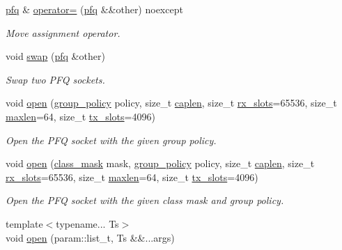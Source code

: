 \begin{DoxyCompactItemize}
\hyperlink{classnet_1_1pfq}{pfq} \& \hyperlink{classnet_1_1pfq_aeacd42c1616840fa20e67bbf47c71e70}{operator=} (\hyperlink{classnet_1_1pfq}{pfq} \&\&other) noexcept
\begin{DoxyCompactList}\small\item\em Move assignment operator. \end{DoxyCompactList}\item 
void \hyperlink{classnet_1_1pfq_a762b45c2020a73e503cdbc2b4631db1c}{swap} (\hyperlink{classnet_1_1pfq}{pfq} \&other)
\begin{DoxyCompactList}\small\item\em Swap two P\+F\+Q sockets. \end{DoxyCompactList}\item 
void \hyperlink{classnet_1_1pfq_af772cc40fb2782dfd27e8af04bc0c5dc}{open} (\hyperlink{namespacenet_aedc1a0dde937ddbd0800af02920b1067}{group\+\_\+policy} policy, size\+\_\+t \hyperlink{classnet_1_1pfq_aa915603b2ad8d1226f9bbea0050945c0}{caplen}, size\+\_\+t \hyperlink{classnet_1_1pfq_a878c768492c68fc572a994a58913a3db}{rx\+\_\+slots}=65536, size\+\_\+t \hyperlink{classnet_1_1pfq_a0424e39990711493af4f24a0c3e9be4d}{maxlen}=64, size\+\_\+t \hyperlink{classnet_1_1pfq_aae98015b961c6210081fa29a2ea34da2}{tx\+\_\+slots}=4096)
\begin{DoxyCompactList}\small\item\em Open the P\+F\+Q socket with the given group policy. \end{DoxyCompactList}\item 
void \hyperlink{classnet_1_1pfq_afe7461b569a19d898aa758f96009e868}{open} (\hyperlink{namespacenet_a1dbd93552dc6ef6fbb0bb79d43ca22fd}{class\+\_\+mask} mask, \hyperlink{namespacenet_aedc1a0dde937ddbd0800af02920b1067}{group\+\_\+policy} policy, size\+\_\+t \hyperlink{classnet_1_1pfq_aa915603b2ad8d1226f9bbea0050945c0}{caplen}, size\+\_\+t \hyperlink{classnet_1_1pfq_a878c768492c68fc572a994a58913a3db}{rx\+\_\+slots}=65536, size\+\_\+t \hyperlink{classnet_1_1pfq_a0424e39990711493af4f24a0c3e9be4d}{maxlen}=64, size\+\_\+t \hyperlink{classnet_1_1pfq_aae98015b961c6210081fa29a2ea34da2}{tx\+\_\+slots}=4096)
\begin{DoxyCompactList}\small\item\em Open the P\+F\+Q socket with the given class mask and group policy. \end{DoxyCompactList}\item 
{\footnotesize template$<$typename... Ts$>$ }\\void \hyperlink{classnet_1_1pfq_a5e435f3be2e02f3eeb73aad94f2fe27c}{open} (param\+::list\+\_\+t, Ts \&\&...args)

\end{DoxyCompactItemize}
